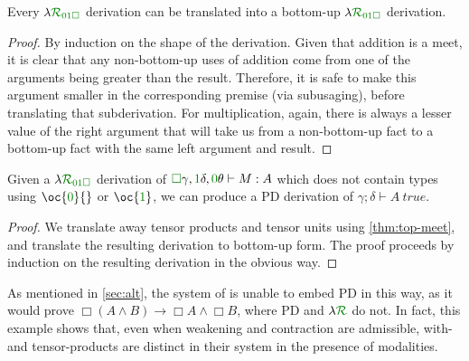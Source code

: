 \begin{lemma}
  Every $\name_{\instPD}$ derivation can be translated into a bottom-up
  $\name_{\instPD}$ derivation.
\end{lemma}
\begin{proof}
  By induction on the shape of the derivation.
  Given that addition is a meet, it is clear that any non-bottom-up uses of
  addition come from one of the arguments being greater than the result.
  Therefore, it is safe to make this argument smaller in the corresponding
  premise (via subusaging), before translating that subderivation.
  For multiplication, again, there is always a lesser value of the right
  argument that will take us from a non-bottom-up fact to a bottom-up fact with
  the same left argument and result.
\end{proof}

\begin{proposition}[\name{} $\to$ PD]
  Given a $\name_{\instPD}$ derivation of
  $\valid\gamma, \true\delta, \unused\theta
  \vdash M : A$ which does not contain types using $\oc{\unused}{}$ or
  $\oc{\true}$, we can produce a PD derivation of
  $\gamma; \delta \vdash A~\mathit{true}$.
\end{proposition}
\begin{proof}
  We translate away tensor products and tensor units using
  \cref{thm:top-meet}, and translate the resulting derivation to bottom-up
  form.
  The proof proceeds by induction on the resulting derivation in the obvious
  way.
\end{proof}

As mentioned in \cref{sec:alt}, the system of \citet{AbelBernardy2020}
is unable to embed PD in this way, as it would prove
$\Box(A \wedge B) \to \Box A \wedge \Box B$, where PD and $\name$ do not.
In fact, this example shows that, even when weakening and contraction are
admissible, with- and tensor-products are distinct in their system in the
presence of modalities.
